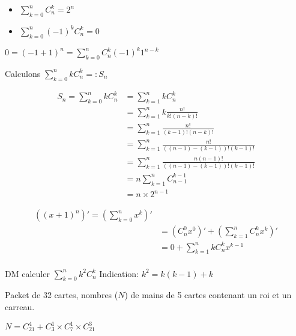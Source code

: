 \documentclass[a4paper, 12pt]{article}
\begin{document}
\begin{corollaire}
    \begin{itemize}
        \item $\sum^n_{k=0} C^k_n = 2^n$
        \item $\sum^n_{k=0} (-1)^k C^k_n = 0$
    \end{itemize}
\end{corollaire}

\begin{demonstration}
    $0 = (-1 +1)^n = \sum^n_{k=0}C^k_n(-1)^k1^{n-k}$
\end{demonstration}

\begin{example}
    Calculons $\sum^n_{k=0} k C^k_n =: S_n$

    \begin{align*}
        S_n = \sum^n_{k=0} k C^k_n &= \sum^n_{k=1} k C^k_n \\
        &= \sum^n_{k=1} k \frac{n!}{k!(n-k)!} \\
        &= \sum^n_{k=1} \frac{n!}{(k-1)!(n-k)!} \\
        &= \sum^n_{k=1} \frac{n!}{((n-1)-(k-1))!(k-1)!} \\
        &= \sum^n_{k=1} \frac{n(n-1)!}{((n-1)-(k-1))!(k-1)!} \\
        &= n \sum^n_{k=1} C^{k-1}_{n-1} \\
        &= n \times 2^{n-1}
    \end{align*}
\end{example}

\begin{example}
    \begin{align*}
        ((x + 1)^n)' = (\sum_{k=0}^n x^k)' \\
        &= (C^0_n x^0)' + (\sum_{k=1}^n C^k_n x^k)' \\
        &= 0 + \sum_{k=1}^n k C^k_n x^{k-1} \\
    \end{align*}
\end{example}

DM calculer $\sum^n_{k=0} k^2 C^k_n$
Indication: $k^2 = k(k-1) + k$

\begin{example}
    Packet de 32 cartes, nombres ($N$) de mains de 5 cartes contenant un roi et un carreau.

    $N = C^4_21 + C^1_3 \times C^1_7 \times C^3_21$
\end{example}
\end{document}
